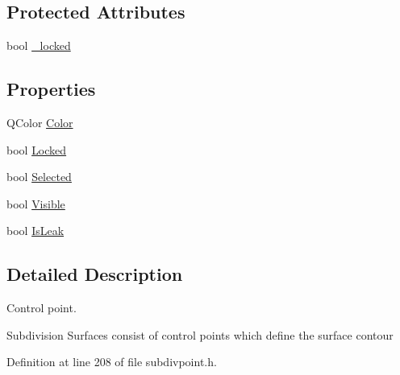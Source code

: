 \subsection*{Protected Attributes}
\begin{DoxyCompactItemize}
\item 
bool \hyperlink{classShipCAD_1_1SubdivisionControlPoint_acf4dc0c2a3d4c52847c68a8a412669f5}{\-\_\-locked}
\end{DoxyCompactItemize}
\subsection*{Properties}
\begin{DoxyCompactItemize}
\item 
Q\-Color \hyperlink{classShipCAD_1_1SubdivisionControlPoint_a8c7a97ce5194163f37a4b655f87bc309}{Color}
\item 
bool \hyperlink{classShipCAD_1_1SubdivisionControlPoint_af7c63177a12f4c60bb4a2a6615482a98}{Locked}
\item 
bool \hyperlink{classShipCAD_1_1SubdivisionControlPoint_a54bf97e33f121843af563f2eebe7d3e5}{Selected}
\item 
bool \hyperlink{classShipCAD_1_1SubdivisionControlPoint_ab796dbf230e01f51a1031ec69f8f7f66}{Visible}
\item 
bool \hyperlink{classShipCAD_1_1SubdivisionControlPoint_a33a15d8a83f43369313d57a854046ff7}{Is\-Leak}
\end{DoxyCompactItemize}


\subsection{Detailed Description}
Control point. 

Subdivision Surfaces consist of control points which define the surface contour 

Definition at line 208 of file subdivpoint.\-h.



